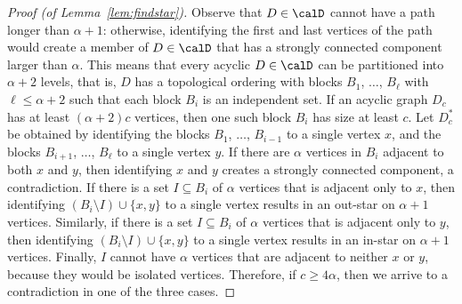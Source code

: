 \begin{proof}[Proof (of Lemma~\ref{lem:findstar})]
Observe that $D\in\calD$ cannot have a path longer than $\alpha+1$: otherwise, identifying the first and last vertices of the path would create a member of $D\in\calD$ that has a strongly connected component larger than $\alpha$. This means that every acyclic $D\in \calD$ can be partitioned into $\alpha+2$ levels, that is, $D$ has a topological ordering with blocks $B_1$, $\dots$, $B_\ell$ with $\ell\le \alpha+2$ such that each block $B_i$ is an independent set. If an acyclic graph $D_c$ has at least $(\alpha+2)c$ vertices, then one such block $B_i$ has size at least $c$. Let $D^*_c$ be obtained by identifying the blocks $B_1$, $\dots$, $B_{i-1}$ to a single vertex $x$, and the blocks $B_{i+1}$, $\dots$, $B_\ell$ to a single vertex $y$. If there are $\alpha$ vertices in $B_i$ adjacent to both $x$ and $y$, then identifying $x$ and $y$ creates a strongly connected component, a contradiction. If there is a set $I\subseteq B_i$ of  $\alpha$ vertices that is adjacent only to $x$, then identifying $(B_i\setminus I)\cup \{x,y\}$ to a single vertex results in an out-star on $\alpha+1$ vertices. Similarly, if there is a set $I\subseteq B_i$ of  $\alpha$ vertices that is adjacent only to $y$, then identifying $(B_i\setminus I)\cup \{x,y\}$ to a single vertex results in an in-star on $\alpha+1$ vertices. Finally, $I$ cannot have $\alpha$ vertices that are adjacent to neither $x$ or $y$, because they would be isolated vertices. Therefore, if $c\ge 4\alpha$, then we arrive to a contradiction in one of the three cases. 
\end{proof}